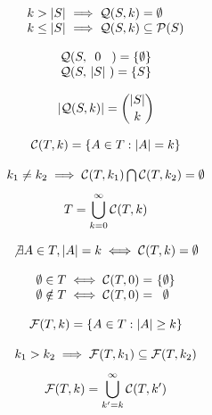\begin{corollary}
	\[\begin{array}{l@{\ }l}
		k > |S| &\implies \Qcal(S,k) = \emptyset \\
		k \leq |S| &\implies \Qcal(S,k) \subseteq \Pcal(S)
	\end{array}\]
\end{corollary}

\begin{remark}
	\[\begin{array}{l@{\ }c@{\ }r}
		\Qcal(S,& 0 &) = \{\emptyset\} \\
		\Qcal(S,&|S|&) = \{S\}
	\end{array}\]
\end{remark}

\begin{lemma}
	\[ |\mathcal{Q}(S,k)| = \displaystyle \binom{|S|}{k} \]
\end{lemma}

\begin{definition}
	\[ \mathcal{C}(T,k) = \{A \in T : |A| = k\} \]
\end{definition}

\begin{corollary}
	\[\begin{array}{c}
		k_1 \neq k_2 \implies \mathcal{C}(T,k_1) \bigcap \mathcal{C}(T,k_2) = \emptyset \\ [8pt]
		T = \displaystyle \bigcup \limits_{k = 0}^{\infty} \mathcal{C}(T,k)
	\end{array}\]
\end{corollary}

\begin{corollary}
	\[ \not\exists A \in T, |A| = k \iff \mathcal{C}(T,k) = \emptyset \]
\end{corollary}

\begin{remark}
	\[\begin{array}{l@{\ }c}
		\emptyset \in T \iff \Ccal(T,0) =& \{\emptyset\} \\
		\emptyset \notin T \iff \Ccal(T,0) =& \emptyset
	\end{array}\]
\end{remark}

\begin{definition}
	\[ \mathcal{F}(T,k) = \{A \in T : |A| \geq k\} \]
\end{definition}

\begin{corollary}
	\[\begin{array}{c}
		k_1 > k_2 \implies \mathcal{F}(T,k_1) \subseteq \mathcal{F}(T,k_2) \\ [8pt]
		\mathcal{F}(T,k) = \displaystyle \bigcup \limits_{k' = k}^{\infty} \mathcal{C}(T,k')
	\end{array}\]
\end{corollary}

